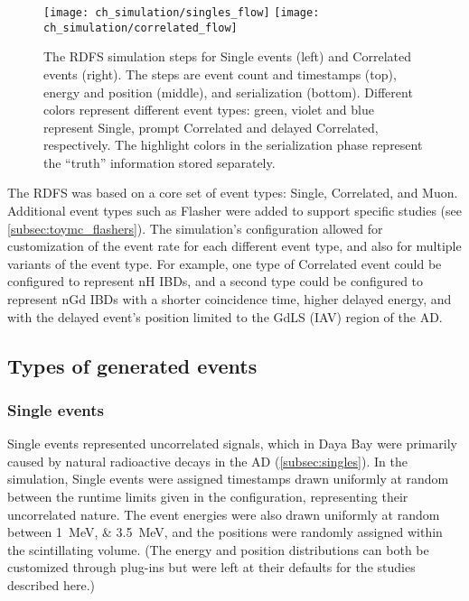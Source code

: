 \begin{figure}
    \centering
    \texttt{[image: ch\_simulation/singles\_flow]}
    \texttt{[image: ch\_simulation/correlated\_flow]}
    \caption[Reconstructed-Data File Simulation flowchart]{
        The RDFS simulation steps
        for Single events (left) and Correlated events (right).
        The steps are event count and timestamps (top),
        energy and position (middle), and serialization (bottom).
        Different colors represent different event types:
        green, violet and blue represent Single,
        prompt Correlated and delayed Correlated,
        respectively.
        The highlight colors in the serialization phase
        represent the ``truth'' information stored separately.
    }
    \label{fig:my_toymc_flowchart}
\end{figure}


The RDFS was based on a core set of event types:
Single, Correlated, and Muon.
Additional event types such as Flasher were added to support specific studies
(see \cref{subsec:toymc_flashers}).
The simulation's configuration allowed for customization of the event rate
for each different event type,
and also for multiple variants of the event type.
For example, one type of Correlated event could be configured to represent nH IBDs,
and a second type could be configured to represent nGd IBDs
with a shorter coincidence time, higher delayed energy,
and with the delayed event's position limited to the GdLS (IAV) region of the AD.

\subsection{Types of generated events}

\subsubsection{Single events}

Single events represented uncorrelated signals,
which in Daya Bay were primarily caused by natural radioactive decays in the AD
(\cref{subsec:singles}).
In the simulation, Single events were assigned timestamps
drawn uniformly at random between the runtime limits given in the configuration,
representing their uncorrelated nature.
The event energies were also drawn uniformly at random
between \SIlist{1;3.5}{\MeV},
and the positions were randomly assigned
within the scintillating volume.
(The energy and position distributions can both be customized through plug-ins
but were left at their defaults for the studies described here.)

